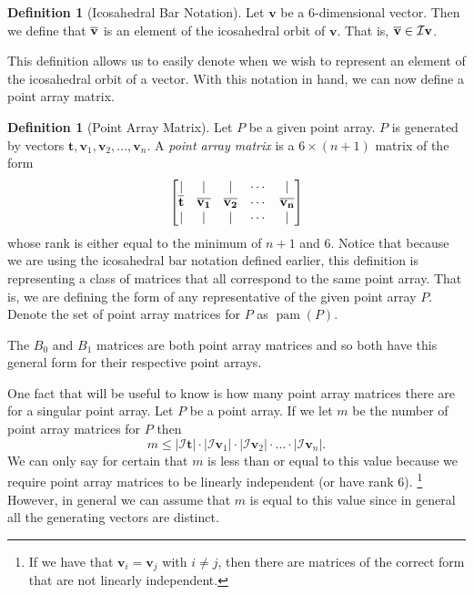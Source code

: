 \documentclass[a4paper,10pt]{article}
\let\oldfootnote\footnote
\renewcommand{\footnote}{\unskip\oldfootnote}
\theoremstyle{plain}
\theoremstyle{definition}
\newtheorem{Definition}[Theorem]{Definition}
\theoremstyle{remark}
\renewcommand{\vec}[1]{\mathbf{#1}}
\newcommand\abs[1]{\left|#1\right|}
\DeclareMathOperator{\pam}{pam}
\begin{document}
\begin{Definition}[Icosahedral Bar Notation]
	Let \(\vec{v}\) be a 6-dimensional vector.
	Then we define that \(\icobar{v}\) is an element of the icosahedral orbit of \(\vec{v}\).
	That is, \(\icobar{v} \in \mathcal{I}\vec{v}\).
\end{Definition}
This definition allows us to easily denote when we wish to represent an element of the icosahedral orbit of a vector.
With this notation in hand, we can now define a point array matrix.
\begin{Definition}[Point Array Matrix]
	Let \(P\) be a given point array.
	\( P \) is generated by vectors \(\vec{t}, \vec{v}_1, \vec{v}_2, \dots, \vec{v}_n\).
	A \emph{point array matrix} is a \( 6 \times (n+1) \) matrix of the form \[\begin{bmatrix}
		| & | & | & \cdots & | \\
		\icobar{t} & \icobar{v_1} & \icobar{v_2} & \cdots & \icobar{v_n} \\
		| & | & | & \cdots & | 
	\end{bmatrix}\]
	whose rank is either equal to the minimum of \( n+1 \) and 6.
	Notice that because we are using the icosahedral bar notation defined earlier, this definition is representing a class of matrices that all correspond to the same point array.
	That is, we are defining the form of any representative of the given point array \( P \).
	Denote the set of point array matrices for \( P \) as \( \pam(P) \).
\end{Definition}
The \( B_0 \) and \( B_1 \) matrices are both point array matrices and so both have this general form for their respective point arrays.

One fact that will be useful to know is how many point array matrices there are for a singular point array.
Let \( P \) be a point array.
If we let \( m \) be the number of point array matrices for \( P \) then
\[m \leq \abs{\mathcal{I}\vec{t}} \cdot \abs{\mathcal{I}\vec{v}_1} \cdot \abs{\mathcal{I}\vec{v}_2} \cdot \dots \cdot \abs{\mathcal{I}\vec{v}_n}.\]
We can only say for certain that \( m \) is less than or equal to this value because we require point array matrices to be linearly independent (or have rank 6).
\footnote{If we have that \( \vec{v}_i = \vec{v}_j \) with \( i \neq j \), then there are matrices of the correct form that are not linearly independent.}
However, in general we can assume that \( m \) is equal to this value since in general all the generating vectors are distinct.
\end{document}
